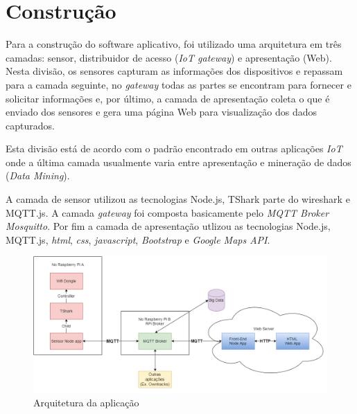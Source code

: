 \chapter{Construção}
\label{chap:Construcao}

Para a construção do software aplicativo, foi utilizado uma arquitetura em
três camadas: sensor, distribuidor de acesso (\emph{IoT gateway}) e apresentação
(Web). Nesta divisão, os sensores capturam as informações dos dispositivos
e repassam para a camada seguinte, no \emph{gateway} todas as partes se
encontram para fornecer e solicitar informações e, por último, a camada de
apresentação coleta o que é enviado dos sensores e gera uma página Web
para visualização dos dados capturados.

Esta divisão está de acordo com o padrão encontrado em outras aplicações
\emph{IoT} onde a última camada usualmente varia entre apresentação e mineração
de dados (\emph{Data Mining}).

A camada de sensor utilizou as tecnologias Node.js, TShark parte
do wireshark e MQTT.js. A camada \emph{gateway} foi composta
basicamente pelo \emph{MQTT Broker} \emph{Mosquitto}. Por fim a camada de
apresentação utlizou as tecnologias Node.js, MQTT.js, \emph{html},
\emph{css}, \emph{javascript}, \emph{Bootstrap} e \emph{Google Maps API}.

\begin{figure}[htb]
	\caption{\label{fig-arq-app}Arquitetura da aplicação}
	\begin{center}
		\includegraphics[width=1\textwidth]{050-construcao/esquema-proj.png}
	\end{center}
\end{figure}
